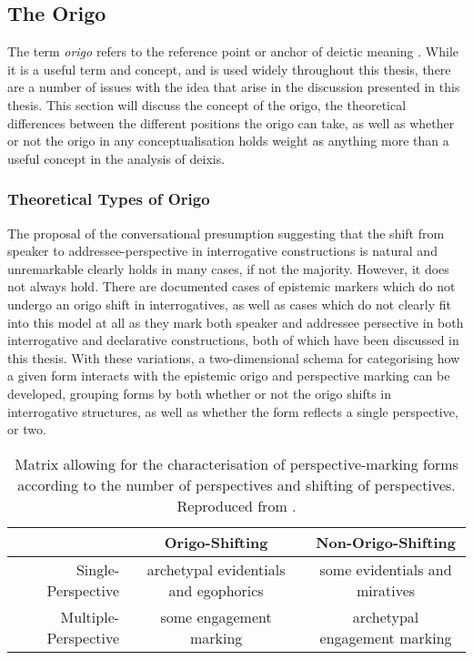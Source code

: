 \subsection{The Origo}\label{ss:Discussion:Origo}
The term \textit{origo} refers to the reference point or anchor of deictic meaning . While it is a useful term and concept, and is used widely throughout this thesis, there are a number of issues with the idea that arise in the discussion presented in this thesis. This section will discuss the concept of the origo, the theoretical differences between the different positions the origo can take, as well as whether or not the origo in any conceptualisation holds weight as anything more than a useful concept in the analysis of deixis.
\subsubsection{Theoretical Types of Origo}
The proposal of the conversational presumption suggesting that the shift from speaker to addressee-perspective in interrogative constructions is natural and unremarkable clearly holds in many cases, if not the majority. However, it does not always hold. There are documented cases of epistemic markers which do not undergo an origo shift in interrogatives, as well as cases which do not clearly fit into this model at all as they mark both speaker and addressee persective in both interrogative and declarative constructions, both of which have been discussed in this thesis. With these variations, a two-dimensional schema for categorising how a given form interacts with the epistemic origo and perspective marking can be developed, grouping forms by both whether or not the origo shifts in interrogative structures, as well as whether the form reflects a single perspective, or two.

\begin{table}
    \begin{tabular}{r c c}
        \hline
                             & Origo-Shifting                        & Non-Origo-Shifting             \\ \hline
        Single-Perspective   & archetypal evidentials and egophorics & some evidentials and miratives \\
        Multiple-Perspective & some engagement marking               & archetypal engagement marking  \\ \hline
    \end{tabular}
    \caption{Matrix allowing for the characterisation of perspective-marking forms according to the number of perspectives and shifting of perspectives. Reproduced from .}
    \label{t:Discussion:OrigoShift}
\end{table}

